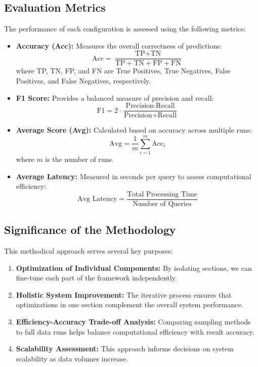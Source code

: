 \subsection{Evaluation Metrics}
\label{sec:metrics}

The performance of each configuration is assessed using the following metrics:

\begin{itemize}
    \item \textbf{Accuracy (Acc):} Measures the overall correctness of predictions:
    \begin{equation}
        \text{Acc} = \frac{\text{TP} + \text{TN}}{\text{TP} + \text{TN} + \text{FP} + \text{FN}}
    \end{equation}
    where TP, TN, FP, and FN are True Positives, True Negatives, False Positives, and False Negatives, respectively.

    \item \textbf{F1 Score:} Provides a balanced measure of precision and recall:
    \begin{equation}
        \text{F1} = 2 \cdot \frac{\text{Precision} \cdot \text{Recall}}{\text{Precision} + \text{Recall}}
    \end{equation}

    \item \textbf{Average Score (Avg):} Calculated based on accuracy across multiple runs:
    \begin{equation}
        \text{Avg} = \frac{1}{m} \sum_{i=1}^m \text{Acc}_i
    \end{equation}
    where $m$ is the number of runs.

    \item \textbf{Average Latency:} Measured in seconds per query to assess computational efficiency:
    \begin{equation}
        \text{Avg Latency} = \frac{\text{Total Processing Time}}{\text{Number of Queries}}
    \end{equation}
\end{itemize}

\subsection{Significance of the Methodology}

This methodical approach serves several key purposes:

\begin{enumerate}
    \item \textbf{Optimization of Individual Components:} By isolating sections, we can fine-tune each part of the framework independently.
    \item \textbf{Holistic System Improvement:} The iterative process ensures that optimizations in one section complement the overall system performance.
    \item \textbf{Efficiency-Accuracy Trade-off Analysis:} Comparing sampling methods to full data runs helps balance computational efficiency with result accuracy.
    \item \textbf{Scalability Assessment:} This approach informs decisions on system scalability as data volumes increase.
\end{enumerate}


